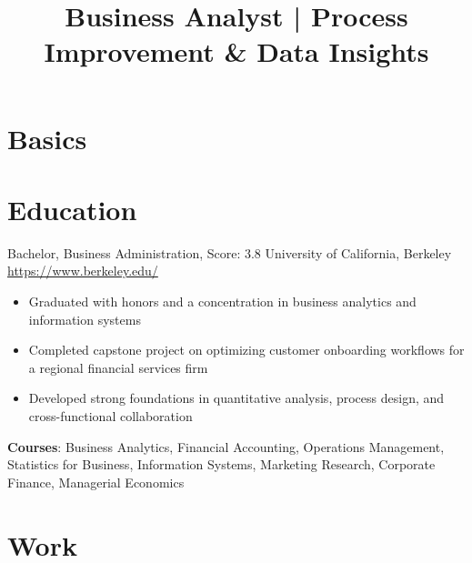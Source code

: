 \documentclass[a4paper, serif, 10pt]{moderncv}
\title{Business Analyst | Process Improvement \& Data Insights}
\begin{document}
\maketitle

\section{Basics}

\section{Education}

        {Bachelor, Business Administration, Score: 3.8}
        {University of California, Berkeley}
        {\url{https://www.berkeley.edu/}}
        {}
        {\begin{itemize}
\item Graduated with honors and a concentration in business analytics and information systems
\item Completed capstone project on optimizing customer onboarding workflows for a regional financial services firm
\item Developed strong foundations in quantitative analysis, process design, and cross-functional collaboration
\end{itemize}
\textbf{Courses}: Business Analytics, Financial Accounting, Operations Management, Statistics for Business, Information Systems, Marketing Research, Corporate Finance, Managerial Economics}
\section{Work}
\end{document}
